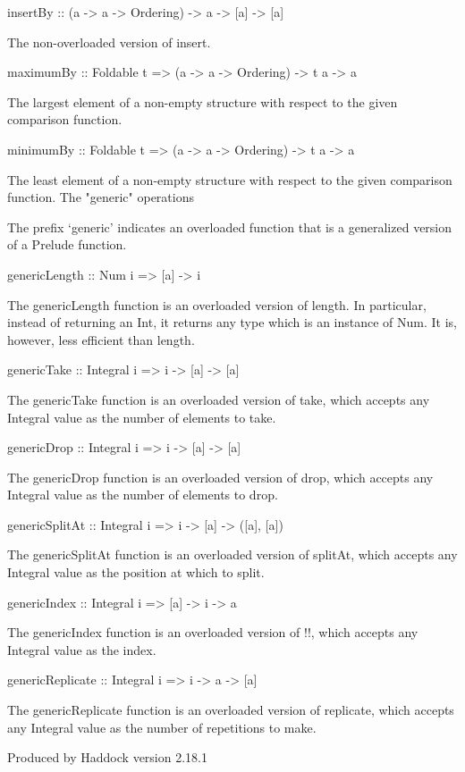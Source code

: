 insertBy :: (a -> a -> Ordering) -> a -> [a] -> [a]

The non-overloaded version of insert.

maximumBy :: Foldable t => (a -> a -> Ordering) -> t a -> a

The largest element of a non-empty structure with respect to the given comparison function.

minimumBy :: Foldable t => (a -> a -> Ordering) -> t a -> a

The least element of a non-empty structure with respect to the given comparison function.
The "generic" operations

The prefix `generic' indicates an overloaded function that is a generalized version of a Prelude function.

genericLength :: Num i => [a] -> i

The genericLength function is an overloaded version of length. In particular, instead of returning an Int, it returns any type which is an instance of Num. It is, however, less efficient than length.

genericTake :: Integral i => i -> [a] -> [a]

The genericTake function is an overloaded version of take, which accepts any Integral value as the number of elements to take.

genericDrop :: Integral i => i -> [a] -> [a]

The genericDrop function is an overloaded version of drop, which accepts any Integral value as the number of elements to drop.

genericSplitAt :: Integral i => i -> [a] -> ([a], [a])

The genericSplitAt function is an overloaded version of splitAt, which accepts any Integral value as the position at which to split.

genericIndex :: Integral i => [a] -> i -> a

The genericIndex function is an overloaded version of !!, which accepts any Integral value as the index.

genericReplicate :: Integral i => i -> a -> [a]

The genericReplicate function is an overloaded version of replicate, which accepts any Integral value as the number of repetitions to make.

Produced by Haddock version 2.18.1